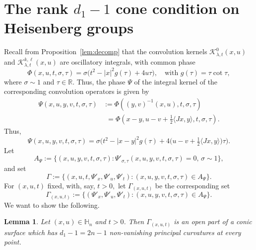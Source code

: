 \documentclass[leqno]{amsart}
\newtheorem{lemma}[theorem]{Lemma}
\theoremstyle{definition}
\theoremstyle{remark}
\numberwithin{equation}{section}
\newcommand{\R}{\mathbb{R}}
\newcommand\bbH{{\mathbb {H}}}
\newcommand\sK{{\mathscr {K}}}
\begin{document}
\section{The rank $d_1-1$ cone condition  on  Heisenberg  groups}\label{cinecurv}

Recall from Proposition~\ref{lem:decomp}  that the convolution kernels $\sK_{\lambda,t}^{0}(x, u)$ and $\sK_{\lambda,t}^{k,\ell}(x, u)$ are oscillatory integrals, with common phase
\[
\Phi(x,u,t,\sigma,\tau)
=\sigma\big(t^2-|x|^2 g(\tau)+4u\tau\big),
\quad \text{with } g(\tau)=\tau\cot\tau,
\]
where $\sigma\sim 1$ and $\tau\in \R.$
Thus, the phase $\Psi$ of the integral kernel of the corresponding convolution operators is given by
\begin{align*}
\Psi(x,u, y,v,t,\sigma, \tau)
& :=\Phi((y,v)^{-1}(x,u),t,\sigma,\tau) \\
& \phantom{:}= \Phi(x-y,u-v+\tfrac 1 2 \langle Jx,y\rangle,t,\sigma,\tau).
\end{align*}
Thus, 
$$
\Psi(x,u, y,v,t,\sigma, \tau)=\sigma\Big( t^2-|x-y|^2 g(\tau) +4\big (u-v+\tfrac 1 2 \langle Jx,y\rangle\big)\tau\Big).
$$
Let 
$$A_\Psi:=\{(x,u, y,v,t,\sigma, \tau): \Psi'_{\sigma,\tau}(x,u, y,v,t,\sigma, \tau)=0,\, \sigma\sim 1\},$$
and set
$$
\Gamma:=\{(x,u,t,\Psi'_x,\Psi'_u,\Psi'_t): (x,u, y,v,t,\sigma, \tau)\in A_{\Psi}\}.
$$
For $(x,u,t)$ fixed, with, say, $t>0,$  let $\Gamma_{(x,u,t)}$ be  the corresponding  set 
\[
\Gamma_{(x,u,t)}:=\{(\Psi'_x,\Psi'_u,\Psi'_t): (x,u, y,v,t,\sigma, \tau)\in A_{\Psi}\}.
\]
We want to show the following.

\begin{lemma}\label{cine}
Let $(x,u)\in\bbH_n$ and $t>0$. Then $\Gamma_{(x,u,t)}$ is an open part of a conic surface which has $d_1-1=2n-1$ non-vanishing principal curvatures at every point.
\end{lemma}
\end{document}
